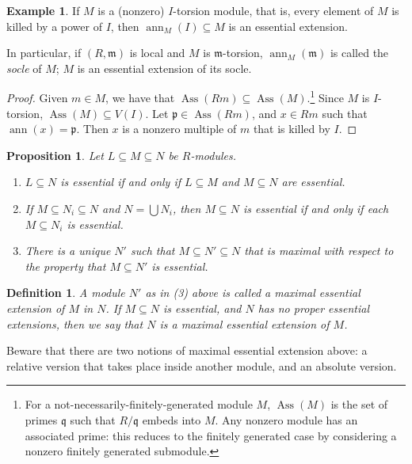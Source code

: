 \documentclass[11pt]{book}
\newtheorem{proposition}[theorem]{Proposition}
\newtheorem{definition}[theorem]{Definition}
\numberwithin{equation}{section}
\numberwithin{theorem}{chapter}
\theoremstyle{definition}
\newtheorem{example}[theorem]{Example}
\newtheorem*{basic properties}{Basic Properties}
\newtheorem*{Important Remark}{Important Remark}
\theoremstyle{remark}
\newcommand{\m}{\mathfrak{m}}
\newcommand{\p}{\mathfrak{p}}
\newcommand{\q}{\mathfrak{q}}
\newcommand{\Ass}{\operatorname{Ass}}
\newcommand{\ann}{\operatorname{ann}}
\begin{document}
\begin{example}\label{ex:socle essential}
	If $M$ is a (nonzero) $I$-torsion module, that is, every element of $M$ is killed by a power of $I$, then $\ann_M(I)\subseteq M$ is an essential extension.
	
	In particular, if $(R,\m)$ is local and $M$ is $\m$-torsion, $\ann_M(\m)$ is called the \emph{socle} of $M$; $M$ is an essential extension of its socle.
\end{example}
\begin{proof}
	Given $m\in M$, we have that $\Ass(Rm)\subseteq \Ass(M)$.\footnote{For a not-necessarily-finitely-generated module $M$, $\Ass(M)$ is the set of primes $\q$ such that $R/\q$ embeds into $M$. Any nonzero module has an associated prime: this reduces to the finitely generated case by considering a nonzero finitely generated submodule.} Since $M$ is $I$-torsion, $\Ass(M)\subseteq V(I)$. Let $\p\in \Ass(Rm)$, and $x\in Rm$ such that $\ann(x)=\p$. Then $x$ is a nonzero multiple of $m$ that is killed by $I$.
\end{proof}

\begin{proposition}
	Let $L\subseteq M \subseteq N$ be $R$-modules.
	\begin{enumerate}
		\item $L\subseteq N$ is essential if and only if $L\subseteq M$ and $M \subseteq N$ are essential.
		\item If $M \subseteq N_i \subseteq N$ and $N=\bigcup N_i$, then $M \subseteq N$ is essential if and only if each $M \subseteq N_i$ is essential.
		\item There is a unique $N'$ such that $M \subseteq N' \subseteq N$ that is maximal with respect to the property that $M \subseteq N'$ is essential.
	\end{enumerate}
\end{proposition}

\begin{definition}
	A module $N'$ as in (3) above is called a \emph{maximal essential extension of $M$ in $N$}.
	 If $M\subseteq N$ is essential, and $N$ has no proper essential extensions, then we say that $N$ is a \emph{maximal essential extension} of $M$.
\end{definition}

Beware that there are two notions of maximal essential extension above: a relative version that takes place inside another module, and an absolute version.
\end{document}
